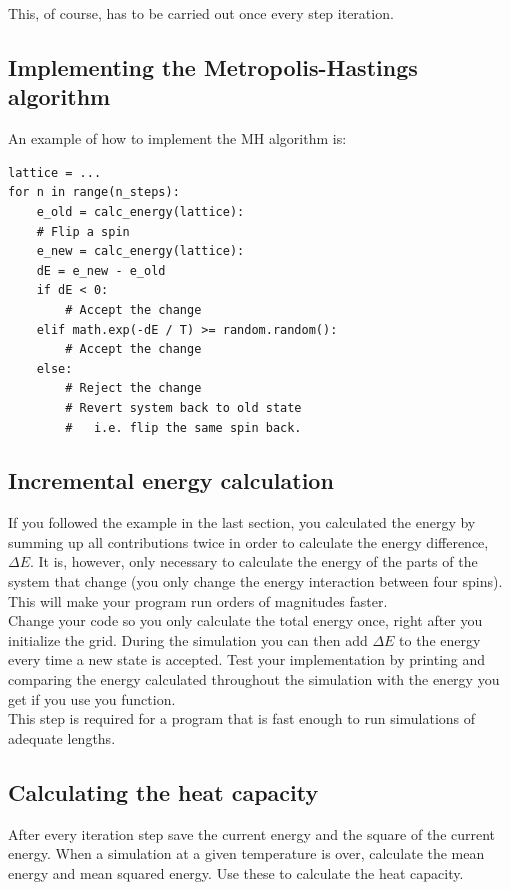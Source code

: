 \documentclass{article}
\begin{document}
This, of course, has to be carried out once every step iteration.

\subsection{Implementing the Metropolis-Hastings algorithm}
An example of how to implement the MH algorithm is: 

\begin{lstlisting}
lattice = ...
for n in range(n_steps):
    e_old = calc_energy(lattice):
    # Flip a spin
    e_new = calc_energy(lattice):
    dE = e_new - e_old
    if dE < 0:
        # Accept the change
    elif math.exp(-dE / T) >= random.random():
        # Accept the change
    else:
        # Reject the change
        # Revert system back to old state
        #   i.e. flip the same spin back.
\end{lstlisting}

\subsection{Incremental energy calculation}

If you followed the example in the last section,
you calculated the energy by summing up all contributions twice in order to
calculate the energy difference, $\Delta E$.
It is, however, only necessary to calculate the energy of the parts of the
system that change (you only change the energy interaction between four spins).
This will make your program run orders of magnitudes faster.\\

Change your code so you only calculate the total energy once,
right after you initialize the grid.
During the simulation you can then add $\Delta E$ to the energy every
time a new state is accepted.
Test your implementation by printing and comparing the energy
calculated throughout the simulation with the energy you get if
you use you  function.\\

This step is required for a program that is fast enough to
run simulations of adequate lengths.

\subsection{Calculating the heat capacity}

After every iteration step save the current energy and the square of the current energy.
When a simulation at a given temperature is over,
calculate the mean energy and mean squared energy.
Use these to calculate the heat capacity.\\
\end{document}

